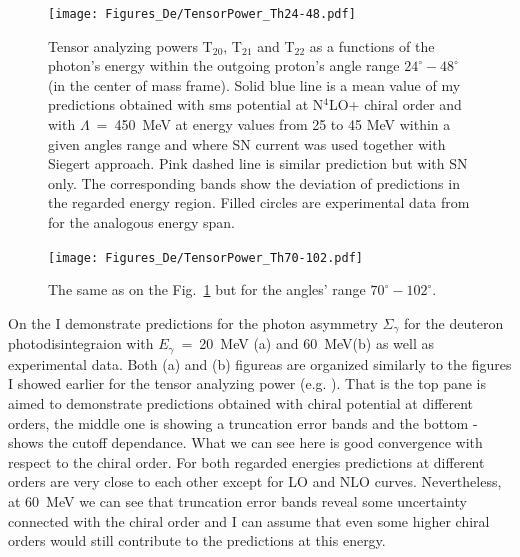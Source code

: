     \begin{figure}[h]
        \begin{center}
        \texttt{[image: Figures\_De/TensorPower\_Th24-48.pdf]}
        \end{center}
        \caption{Tensor analyzing powers T$_{20}$, T$_{21}$ and T$_{22}$ as a functions of the
        photon's energy within the outgoing proton's angle range $24^{\circ} - 48^{\circ}$
        (in the center of mass frame).
        Solid blue line is a mean value of my predictions obtained with
        \gls*{sms} potential at N$^4$LO+ chiral order and with $\Lambda$~=~450~MeV
        at energy values from 25 to 45 MeV within
        a given angles range and
        where SN current was used together with Siegert approach. 
        Pink dashed line is similar prediction but with SN only. 
        The corresponding bands show the deviation of predictions in the regarded
        energy region.
        Filled circles are experimental data
        from \cite{rachek2007} for the analogous energy span.}
        \label{tensor_energy_24-48}
    \end{figure}

    \begin{figure}[h]
        \begin{center}
        \texttt{[image: Figures\_De/TensorPower\_Th70-102.pdf]}
        \end{center}
        \caption{The same as on the Fig.~\ref*{tensor_energy_24-48} but
        for the angles' range $70^{\circ} - 102^{\circ}$.}
        \label{tensor_energy_70-102}
    \end{figure}
    
    On the  I demonstrate predictions
    for the photon asymmetry $\Sigma_\gamma$ for the 
    deuteron photodisintegraion with $E_\gamma$~=~20~MeV (a)
    and 60~MeV(b) as well as experimental data.
    Both (a) and (b) figureas are organized similarly to the 
    figures I showed earlier for the tensor analyzing power (e.g. ).
    That is the top pane is aimed to demonstrate predictions obtained
    with chiral potential at different orders, the middle 
    one is showing a truncation error bands and the bottom - shows 
    the cutoff dependance. What we can see here is good 
    convergence with respect to the chiral order. For both regarded 
    energies predictions at different orders are very close to each other
    except for LO and NLO curves. Nevertheless, at 60~MeV we can see 
    that truncation error bands reveal some uncertainty connected 
    with the chiral order and I can assume that even some higher chiral 
    orders would still contribute to the predictions at this energy.

